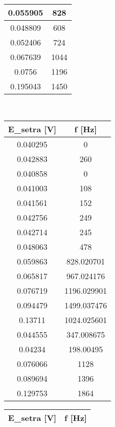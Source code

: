 \begin{table}[H]
\begin{tabular}{|c|c|}
    0.055905         & 828        \\ \hline
    0.048809         & 608        \\ \hline
    0.052406         & 724        \\ \hline
    0.067639         & 1044       \\ \hline
    0.0756           & 1196       \\ \hline
    0.195043         & 1450       \\ \hline
    \end{tabular}
    \\
    \centering
    \begin{tabular}{|c|c|}
    \hline
    E\_setra {[}V{]} & f {[}Hz{]}  \\ \hline
    0.040295         & 0           \\ \hline
    0.042883         & 260         \\ \hline
    0.040858         & 0           \\ \hline
    0.041003         & 108         \\ \hline
    0.041561         & 152         \\ \hline
    0.042756         & 249         \\ \hline
    0.042714         & 245         \\ \hline
    0.048063         & 478         \\ \hline
    0.059863         & 828.020701  \\ \hline
    0.065817         & 967.024176  \\ \hline
    0.076719         & 1196.029901 \\ \hline
    0.094479         & 1499.037476 \\ \hline
    0.13711          & 1024.025601 \\ \hline
    0.044555         & 347.008675  \\ \hline
    0.04234          & 198.00495   \\ \hline
    0.076066         & 1128        \\ \hline
    0.089694         & 1396        \\ \hline
    0.129753         & 1864        \\ \hline
    \end{tabular}
    \hspace{1cm}
    \centering
    \begin{tabular}{|c|c|}
    \hline
    E\_setra {[}V{]} & f {[}Hz{]} \\ \hline

\end{tabular}
\end{table}

